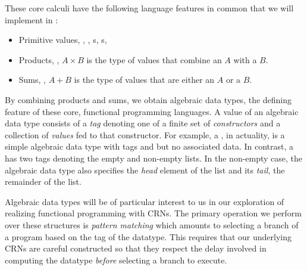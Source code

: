 These core calculi have the following language features in common that we will implement in \reactamole:
\begin{itemize}[itemsep=0pt]
  \item Primitive values, \eg, , s, s, \etc
  \item Products, \ie, \( A \times B \) is the type of values that combine an \( A \) with a \( B \).
  \item Sums, \ie, \( A + B \) is the type of values that are either an \( A \) or a \( B \).
\end{itemize}
By combining products and sums, we obtain algebraic data types, the defining feature of these core, functional programming languages.
A value of an algebraic data type consists of a \emph{tag} denoting one of a finite set of \emph{constructors} and a collection of \emph{values} fed to that constructor.
For example, a , in actuality, is a simple algebraic data type with tags  and  but no associated data.
In contrast, a  has two tags denoting the empty and non-empty lists.
In the non-empty case, the algebraic data type also specifies the \emph{head} element of the list and its \emph{tail}, the remainder of the list.

Algebraic data types will be of particular interest to us in our exploration of realizing functional programming with CRNs.
The primary operation we perform over these structures is \emph{pattern matching} which amounts to selecting a branch of a program based on the tag of the datatype.
This requires that our underlying CRNs are careful constructed so that they respect the delay involved in computing the datatype \emph{before} selecting a branch to execute.

